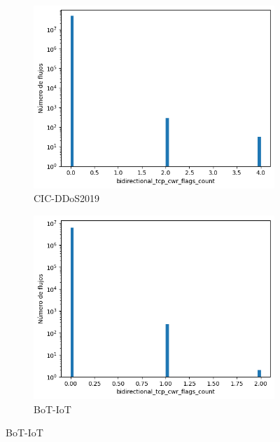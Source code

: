 \begin{figure}[H]
    \centering
    \begin{subfigure}[b]{0.32\textwidth}
        \centering
        \includegraphics[width=\textwidth]{media/packet_pincer_cicddos/bidirectional_tcp_cwr_flags_count_linear_x_log_y.png}
        \caption{CIC-DDoS2019}
    \end{subfigure}
    \hfill
    \begin{subfigure}[b]{0.32\textwidth}
        \centering
        \includegraphics[width=\linewidth]{media/packet_pincer_botiot/bidirectional_tcp_cwr_flags_count_linear_x_log_y.png}
        \caption{BoT-IoT}
    \end{subfigure}
    \hfill

\end{figure}
